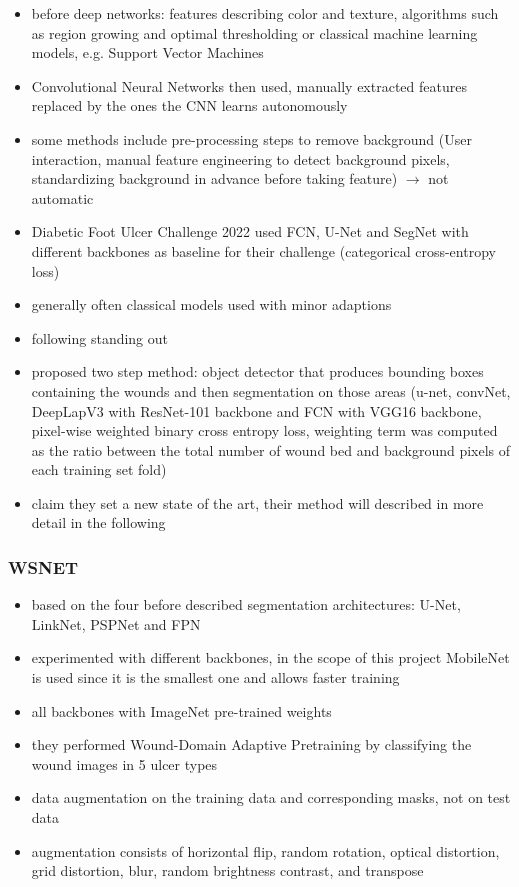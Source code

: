 \begin{itemize}
	\item before deep networks: features describing color and texture, algorithms such as region growing and optimal thresholding or classical machine learning models, e.g. Support Vector Machines \cite{Scebba2022}
	\item Convolutional Neural Networks then used, manually extracted features replaced by the ones the CNN learns autonomously \cite{Scebba2022}
	\item some methods include pre-processing steps to remove background (User interaction, manual feature engineering to detect background pixels, standardizing background in advance before taking feature) $\rightarrow$ not automatic
	\item Diabetic Foot Ulcer Challenge 2022 used FCN, U-Net and SegNet with different backbones as baseline for their challenge (categorical cross-entropy loss) \cite{DFUC2022}
	\item generally often classical models used with minor adaptions
	\item following standing out
	\item \citeauthor{Scebba2022} proposed two step method: object detector that produces bounding boxes containing the wounds and then segmentation on those areas (u-net, convNet, DeepLapV3 with ResNet-101 backbone and FCN with VGG16 backbone, pixel-wise weighted binary cross entropy loss, weighting term was computed as the ratio between the total number of wound bed and background pixels of each training set fold)
	\item \citeauthor{Oota_2023_WACV} claim they set a new state of the art, their method will described in more detail in the following
\end{itemize}


\subsubsection{WSNET}

\begin{itemize}
	\item based on the four before described segmentation architectures: U-Net, LinkNet, PSPNet and FPN
	\item experimented with different backbones, in the scope of this project MobileNet \cite{howard2017mobilenets} is used since it is the smallest one and allows faster training
	\item all backbones with ImageNet pre-trained weights
	\item they performed Wound-Domain Adaptive Pretraining by classifying the wound images in 5 ulcer types
	\item data augmentation on the training data and corresponding masks, not on test data
	\item augmentation consists of horizontal flip, random rotation, optical distortion, grid distortion, blur, random brightness contrast, and transpose
\end{itemize}

